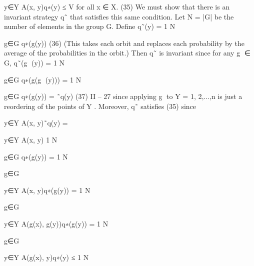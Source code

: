 y∈Y
A(x, y)q∗(y) ≤ V for all x ∈ X. (35)
We must show that there is an invariant strategy q˜ that satisfies this same condition. Let
N = |G| be the number of elements in the group G. Define
q˜(y) = 1
N


g∈G
q∗(g(y)) (36)
(This takes each orbit and replaces each probability by the average of the probabilities in
the orbit.) Then q˜ is invariant since for any g ∈ G,
q˜(g
(y)) = 1
N


g∈G
q∗(g(g
(y)))
= 1
N


g∈G
q∗(g(y)) = ˜q(y)
(37)
II – 27
since applying g to Y = {1, 2,...,n} is just a reordering of the points of Y . Moreover, q˜
satisfies (35) since


y∈Y
A(x, y)˜q(y) = 

y∈Y
A(x, y) 1
N


g∈G
q∗(g(y))
= 1
N


g∈G


y∈Y
A(x, y)q∗(g(y))
= 1
N


g∈G


y∈Y
A(g(x), g(y))q∗(g(y))
= 1
N


g∈G


y∈Y
A(g(x), y)q∗(y)
≤
1
N


